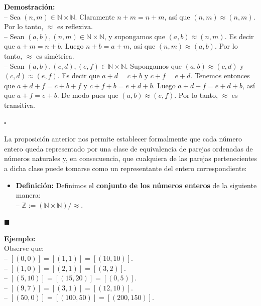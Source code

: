 \documentclass[10 pt]{article}
\begin{document}
\Large{\textbf{Demostración:} \\

-- Sea $(n,m) \in \mathbb N \times \mathbb N$. Claramente $n+m=n+m$, así que $(n,m) \approx (n,m)$. Por lo tanto, $\approx$ es reflexiva. \\

-- Sean $(a,b),(n,m) \in \mathbb N \times \mathbb N$, y supongamos que $(a,b) \approx (n,m)$. Es decir que $a+m=n+b$. Luego $n+b=a+m$, así que $(n,m) \approx (a,b)$. Por lo tanto, $\approx$ es simétrica. \\

-- Sean $(a,b),(c,d),(e,f) \in \mathbb N \times \mathbb N$. Supongamos que $(a,b) \approx (c,d)$ y $(c,d) \approx (e,f)$. Es decir que $a+d=c+b$ y $c+f=e+d$. Tenemos entonces que $a+d+f=c+b+f$ y $c+f+b=e+d+b$. Luego $a+d+f=e+d+b$, así que $a+f=e+b$. De modo pues que $(a,b) \approx (e,f)$. Por lo tanto, $\approx$ es transitiva.} \\

\begin{flushright}
    $\square$
\end{flushright}

\Large{La proposición anterior nos permite establecer formalmente que cada número entero queda representado por una clase de equivalencia de parejas ordenadas de números naturales y, en consecuencia, que cualquiera de las parejas pertenecientes a dicha clase puede tomarse como un representante del entero correspondiente:} \\

\begin{itemize}
    \item \Large{\textbf{Definición:} Definimos el \textbf{conjunto de los números enteros} de la siguiente manera: \\
    
    -- $\mathbb Z:=(\mathbb N \times \mathbb N)/\approx$.} \\
\end{itemize}

\begin{flushright}
    $\blacksquare$
\end{flushright}

\Large{\textbf{Ejemplo:}} \\

\Large{Observe que: \\

-- $[(0,0)]=[(1,1)]=[(10,10)]$. \\

-- $[(1,0)]=[(2,1)]=[(3,2)]$. \\

-- $[(5,10)]=[(15,20)]=[(0,5)]$. \\

-- $[(9,7)]=[(3,1)]=[(12,10)]$. \\

-- $[(50,0)]=[(100,50)]=[(200,150)]$.} \\
\end{document}
